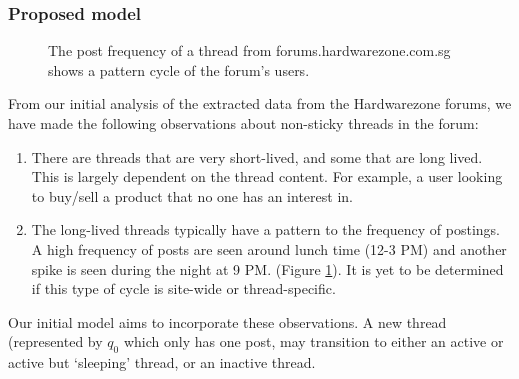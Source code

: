 \documentclass[12 pt]{article}
\begin{document}
\subsubsection{Proposed model}
\begin{figure}\label{sleepcycle}
\caption{The post frequency of a thread from forums.hardwarezone.com.sg shows a pattern cycle of the forum's users.}
\end{figure}
From our initial analysis of the extracted data from the Hardwarezone forums, we have made the following observations about non-sticky threads in the forum:
\begin{enumerate}
	\item There are threads that are very short-lived, and some that are long lived. This is largely dependent on the thread content. For example, a user looking to buy/sell a product that no one has an interest in. %
	\item The long-lived threads typically have a pattern to the frequency of postings. A high frequency of posts are seen around lunch time (12-3 PM) and another spike is seen during the night at 9 PM. (Figure \ref{sleepcycle}). It is yet to be determined if this type of cycle is site-wide or thread-specific.
\end{enumerate}
Our initial model aims to incorporate these observations. A new thread (represented by $q_0$ which only has one post, may transition to either an active or active but `sleeping' thread, or an inactive thread.
\end{document}
